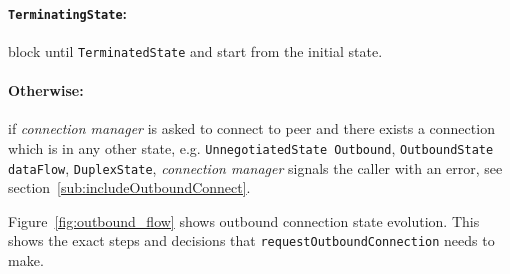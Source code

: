 \documentclass{article}
\def\UnnegotiatedStateOut{\texttt{UnnegotiatedState Outbound}}
\def\OutboundStateAny{\texttt{OutboundState dataFlow}}
\def\DuplexState{\texttt{DuplexState}}
\def\TerminatingState{\texttt{TerminatingState}}
\def\TerminatedState{\texttt{TerminatedState}}
\def\connmngr{\textit{connection manager}}
\begin{document}
\paragraph{\TerminatingState{}:} block until \TerminatedState{} and start from
the initial state.

\paragraph{\textnormal{Otherwise}:} if \connmngr{} is asked to connect to
peer and there exists a connection which is in any other state, e.g.
\UnnegotiatedStateOut{}, \OutboundStateAny{}, \DuplexState{}, \connmngr{} signals the caller with an error, see
section~\ref{sub:includeOutboundConnect}.

Figure~\ref{fig:outbound_flow} shows outbound connection state evolution.  This
shows the exact steps and decisions that \texttt{requestOutboundConnection}
needs to make.
\end{document}
